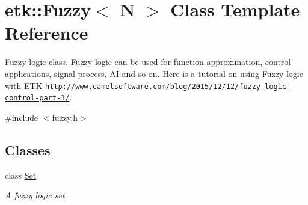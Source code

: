 \hypertarget{classetk_1_1_fuzzy}{\section{etk\-:\-:Fuzzy$<$ N $>$ Class Template Reference}
\label{classetk_1_1_fuzzy}
}


\hyperlink{classetk_1_1_fuzzy}{Fuzzy} logic class. \hyperlink{classetk_1_1_fuzzy}{Fuzzy} logic can be used for function approximation, control applications, signal process, A\-I and so on. Here is a tutorial on using \hyperlink{classetk_1_1_fuzzy}{Fuzzy} logic with E\-T\-K \href{http://www.camelsoftware.com/blog/2015/12/12/fuzzy-logic-control-part-1/}{\tt http\-://www.\-camelsoftware.\-com/blog/2015/12/12/fuzzy-\/logic-\/control-\/part-\/1/}.  




{\ttfamily \#include $<$fuzzy.\-h$>$}

\subsection*{Classes}
\begin{DoxyCompactItemize}
\item 
class \hyperlink{classetk_1_1_fuzzy_1_1_set}{Set}
\begin{DoxyCompactList}\small\item\em A fuzzy logic set. \end{DoxyCompactList}\end{DoxyCompactItemize}
